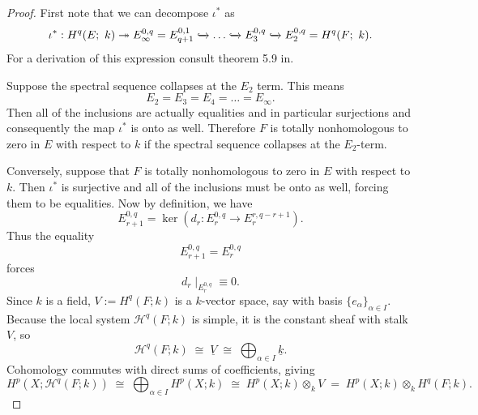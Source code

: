 \begin{proof}
    First note that we can decompose $\iota^*$ as 
    \begin{equation*}
        \iota^*: H^q(E;\ k) \twoheadrightarrow E^{0,q}_\infty = E^{0,1}_{q+1} \xhookrightarrow{} \dots \xhookrightarrow{} E_3^{0,q} \xhookrightarrow{} E^{0,q}_2 = H^q(F; \ k).
    \end{equation*}
    For a derivation of this expression consult theorem 5.9 in\cite{mccleary}. 
    
    Suppose the spectral sequence collapses at the $E_2$ term. This means 
    \begin{equation*}
        E_2 = E_3 = E_4 = \dots = E_\infty.
    \end{equation*}Then all of the inclusions are actually equalities and in particular surjections and consequently the map $\iota^*$ is onto as well. Therefore $F$ is totally nonhomologous to zero in $E$ with respect to $k$ if the spectral sequence collapses at the $E_2$-term.

    Conversely, suppose that $F$ is totally nonhomologous to zero in $E$ with respect to $k$. Then $\iota^*$ is surjective and all of the inclusions must be onto as well, forcing them to be equalities. Now by definition, we have 
    \begin{equation*}
        E_{r+1}^{0,q} = \ker\left(d_r: E_r^{0,q}\to E_r^{r, q-r+1}\right).
    \end{equation*}
     Thus the equality 
    \begin{equation*}
        E_{r+1}^{0,q} = E_{r}^{0,q}
    \end{equation*}
    forces 
    \begin{equation*}
        d_r \mid _{E_r^{0,q}} \equiv 0.
    \end{equation*}
   Since $k$ is a field, $V := H^q(F;k)$ is a $k$-vector space, say 
with basis $\{e_\alpha\}_{\alpha \in I}$. Because the local system 
$\mathcal{H}^q(F;k)$ is simple, it is the constant sheaf with 
stalk $V$, so
\[ \mathcal{H}^q(F; k) \;\cong\; \underline{V} 
   \;\cong\; \bigoplus_{\alpha \in I} \underline{k}. \]
Cohomology commutes with direct sums of coefficients, giving
\[ H^p(X; \mathcal{H}^q(F;k)) \;\cong\; 
   \bigoplus_{\alpha \in I} H^p(X; k) 
   \;\cong\; H^p(X; k) \otimes_k V 
   \;=\; H^p(X;k) \otimes_k H^q(F;k). \]


\end{proof}
